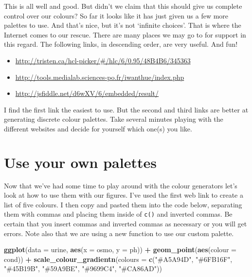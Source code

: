 \documentclass[
]{book}
\newenvironment{Shaded}{\begin{snugshade}}{\end{snugshade}}
\newcommand{\DataTypeTok}[1]{\textcolor[rgb]{0.13,0.29,0.53}{#1}}
\newcommand{\KeywordTok}[1]{\textcolor[rgb]{0.13,0.29,0.53}{\textbf{#1}}}
\newcommand{\NormalTok}[1]{#1}
\newcommand{\OperatorTok}[1]{\textcolor[rgb]{0.81,0.36,0.00}{\textbf{#1}}}
\newcommand{\StringTok}[1]{\textcolor[rgb]{0.31,0.60,0.02}{#1}}
\providecommand{\tightlist}{%
  \setlength{\itemsep}{0pt}\setlength{\parskip}{0pt}}
\begin{document}
This is all well and good. But didn't we claim that this should give us complete control over our colours? So far it looks like it has just given us a few more palettes to use. And that's nice, but it's not `infinite choices'. That is where the Internet comes to our rescue. There are many places we may go to for support in this regard. The following links, in descending order, are very useful. And fun!

\begin{itemize}
\tightlist
\item
  \url{http://tristen.ca/hcl-picker/\#/hlc/6/0.95/48B4B6/345363}
\item
  \url{http://tools.medialab.sciences-po.fr/iwanthue/index.php}
\item
  \url{http://jsfiddle.net/d6wXV/6/embedded/result/}
\end{itemize}

I find the first link the easiest to use. But the second and third links are better at generating discrete colour palettes. Take several minutes playing with the different websites and decide for yourself which one(s) you like.

\hypertarget{use-your-own-palettes}{%
\section{Use your own palettes}\label{use-your-own-palettes}}

Now that we've had some time to play around with the colour generators let's look at how to use them with our figures. I've used the first web link to create a list of five colours. I then copy and pasted them into the code below, separating them with commas and placing them inside of \texttt{c()} and inverted commas. Be certain that you insert commas and inverted commas as necessary or you will get errors. Note also that we are using a new function to use our custom palette.

\begin{Shaded}
\begin{Highlighting}[]
\KeywordTok{ggplot}\NormalTok{(}\DataTypeTok{data =}\NormalTok{ urine, }\KeywordTok{aes}\NormalTok{(}\DataTypeTok{x =}\NormalTok{ osmo, }\DataTypeTok{y =}\NormalTok{ ph)) }\OperatorTok{+}
\StringTok{  }\KeywordTok{geom\_point}\NormalTok{(}\KeywordTok{aes}\NormalTok{(}\DataTypeTok{colour =}\NormalTok{ cond)) }\OperatorTok{+}
\StringTok{  }\KeywordTok{scale\_colour\_gradientn}\NormalTok{(}\DataTypeTok{colours =} \KeywordTok{c}\NormalTok{(}\StringTok{"\#A5A94D"}\NormalTok{, }\StringTok{"\#6FB16F"}\NormalTok{, }\StringTok{"\#45B19B"}\NormalTok{,}
                                    \StringTok{"\#59A9BE"}\NormalTok{, }\StringTok{"\#9699C4"}\NormalTok{, }\StringTok{"\#CA86AD"}\NormalTok{))}
\end{Highlighting}
\end{Shaded}
\end{document}
